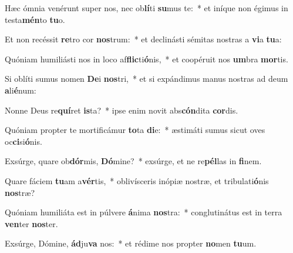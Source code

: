 \item Hæc ómnia venérunt super nos, nec ob\textbf{lí}ti \textbf{su}mus te:~* et iníque non égimus in testa\textbf{mén}to \textbf{tu}o.
\item Et non recéssit \textbf{re}tro cor \textbf{nos}trum:~* et declinásti sémitas nostras a \textbf{vi}a \textbf{tu}a:
\item Quóniam humiliásti nos in loco af\textbf{flic}ti\textbf{ó}nis,~* et coopéruit nos \textbf{um}bra \textbf{mor}tis.
\item Si oblíti sumus nomen \textbf{De}i \textbf{nos}tri,~* et si expándimus manus nostras ad deum \textbf{a}li\textbf{é}num:
\item Nonne Deus re\textbf{quí}ret \textbf{is}ta?~* ipse enim novit abs\textbf{cón}dita \textbf{cor}dis.
\item Quóniam propter te mortificámur \textbf{to}ta \textbf{di}e:~* æstimáti sumus sicut oves oc\textbf{ci}si\textbf{ó}nis.
\item Exsúrge, quare ob\textbf{dór}mis, \textbf{Dó}mine?~* exsúrge, et ne re\textbf{pél}las in \textbf{fi}nem.
\item Quare fáciem \textbf{tu}am a\textbf{vér}tis,~* oblivísceris inópiæ nostræ, et tribulati\textbf{ó}nis \textbf{nos}træ?
\item Quóniam humiliáta est in púlvere \textbf{á}nima \textbf{nos}tra:~* conglutinátus est in terra \textbf{ven}ter \textbf{nos}ter.
\item Exsúrge, Dómine, \textbf{ád}ju\textbf{va} nos:~* et rédime nos propter \textbf{no}men \textbf{tu}um.
